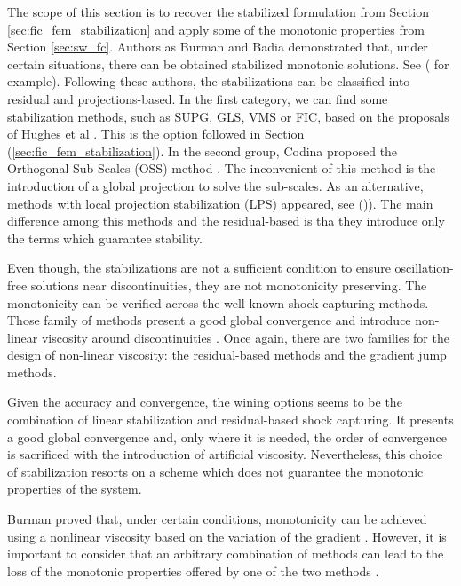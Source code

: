 The scope of this section is to recover the stabilized formulation from Section \ref{sec:fic_fem_stabilization} and apply some of the monotonic properties from Section \ref{sec:sw_fc}. Authors as Burman and Badia demonstrated that, under certain situations, there can be obtained stabilized monotonic solutions. See (\cite{burman2007, burman2010, badia2014} for example).
Following these authors, the stabilizations can be classified into residual and projections-based. In the first category, we can find some stabilization methods, such as SUPG, GLS, VMS or FIC, based on the proposals of Hughes et al \cite{brooks1982,hughes1989,hughes1995}. This is the option followed in Section (\ref{sec:fic_fem_stabilization}). 
In the second group, Codina proposed the Orthogonal Sub Scales (OSS) method \cite{codina2000}. The inconvenient of this method is the introduction of a global projection to solve the sub-scales. As an alternative, methods with local projection stabilization (LPS) appeared, see (\cite{braack2006,badia2012,badia2014,burman2015,matthies2007})). The main difference among this methods and the residual-based is tha they introduce only the terms which guarantee stability.

Even though, the stabilizations are not a sufficient condition to ensure oscillation-free solutions near discontinuities, they are not monotonicity preserving. The monotonicity can be verified across the well-known shock-capturing methods.
Those family of methods present a good global convergence and introduce non-linear viscosity around discontinuities \cite{Johnson1990}.
Once again, there are two families for the design of non-linear viscosity: the residual-based methods and the gradient jump methods.

Given the accuracy and convergence, the wining options seems to be the combination of linear stabilization and residual-based shock capturing. It presents a good global convergence and, only where it is needed, the order of convergence is sacrificed with the introduction of artificial viscosity. Nevertheless, this choice of stabilization resorts on a scheme which does not guarantee the monotonic properties of the system.

Burman proved that, under certain conditions, monotonicity can be achieved using a nonlinear viscosity based on the variation of the gradient \cite{burman2007}. However, it is important to consider that an arbitrary combination of methods can lead to the loss of the monotonic properties offered by one of the two methods \cite{badia2014}.





